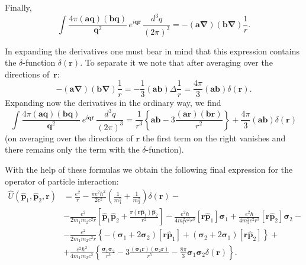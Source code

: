 Finally,
\[
\int\frac{4\pi(\mathbf{aq})(\mathbf{bq})}{\mathbf{q}^2}\,e^{i\mathbf{qr}}\,\frac{d^3q}{(2\pi)^3} = -(\mathbf{a}\boldsymbol{\nabla})(\mathbf{b}\boldsymbol{\nabla})\frac{1}{r}.
\]

In expanding the derivatives one must bear in mind that this expression contains the $\delta$-function $\delta(\mathbf{r})$. To separate it we note that after averaging over the directions of~$\mathbf{r}$:
\[
-(\mathbf{a}\boldsymbol{\nabla})(\mathbf{b}\boldsymbol{\nabla})\frac{1}{r} = -\frac{1}{3}(\mathbf{ab})\Delta\frac{1}{r} = \frac{4\pi}{3}(\mathbf{ab})\delta(\mathbf{r}).
\]
Expanding now the derivatives in the ordinary way, we find
\begin{equation}
\int\frac{4\pi(\mathbf{aq})(\mathbf{bq})}{\mathbf{q}^2}\,e^{i\mathbf{qr}}\,\frac{d^3q}{(2\pi)^3} = \frac{1}{r^3}\left\{\mathbf{ab}-3\frac{(\mathbf{ar})(\mathbf{br})}{r^2}\right\} + \frac{4\pi}{3}(\mathbf{ab})\delta(\mathbf{r})
\tag{83.14}
\end{equation}
(on averaging over the directions of $\mathbf{r}$ the first term on the right vanishes and there remains only the term with the $\delta$-function).

With the help of these formulas we obtain the following final expression for the operator of particle interaction:
\begin{equation}
\begin{split}
\hat{U}(\hat{\mathbf{p}}_1, \hat{\mathbf{p}}_2, \mathbf{r}) &= \frac{e^2}{r} - \frac{\pi e^2\hbar^2}{2c^2}\left(\frac{1}{m_1^2}+\frac{1}{m_2^2}\right)\delta(\mathbf{r}) -{}\\
&- \frac{e^2}{2m_1 m_2 c^2 r}\left[\hat{\mathbf{p}}_1\hat{\mathbf{p}}_2+\frac{\mathbf{r}(\mathbf{r}\hat{\mathbf{p}}_1)\hat{\mathbf{p}}_2}{r^2}\right] - \frac{e^2\hbar}{4m_1^2c^2r^3}[\mathbf{r}\hat{\mathbf{p}}_1]\boldsymbol{\sigma}_1+\frac{e^2\hbar}{4m_2^2c^2r^3}[\mathbf{r}\hat{\mathbf{p}}_2]\boldsymbol{\sigma}_2-{}\\
&-\frac{e^2}{2m_1 m_2 c^2 r}\left\{-(\boldsymbol{\sigma}_1+2\boldsymbol{\sigma}_2)[\mathbf{r}\hat{\mathbf{p}}_1]+(\boldsymbol{\sigma}_2+2\boldsymbol{\sigma}_1)[\mathbf{r}\hat{\mathbf{p}}_2]\right\}+{}\\
&+ \frac{e^2\hbar^2}{4m_1 m_2 c^2}\left\{\frac{\boldsymbol{\sigma}_1\boldsymbol{\sigma}_2}{r^3}-3\frac{(\boldsymbol{\sigma}_1\mathbf{r})(\boldsymbol{\sigma}_2\mathbf{r})}{r^5} - \frac{8\pi}{3}\boldsymbol{\sigma}_1\boldsymbol{\sigma}_2\delta(\mathbf{r})\right\}.
\end{split}
\tag{83.15}
\end{equation}

